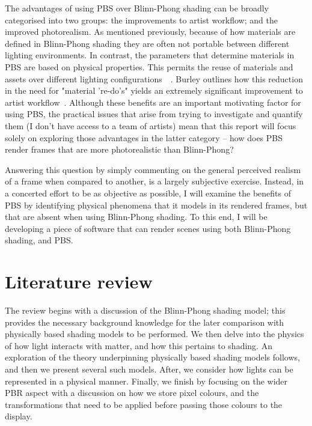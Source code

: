 The advantages of using PBS over Blinn-Phong shading can be broadly categorised into two groups: the improvements to artist workflow; and the improved photorealism. As mentioned previously, because of how materials are defined in Blinn-Phong shading they are often not portable between different lighting environments. In contrast, the parameters that determine materials in PBS are based on physical properties. This permits the reuse of materials and assets over different lighting configurations~\cite{MovingFrostbitetoPBR}~\cite{SIGGRAPH2020Course}. Burley outlines how this reduction in the need for "material 're-do's" yields an extremely significant improvement to artist workflow~\cite{Burley2012Physically}. Although these benefits are an important motivating factor for using PBS, the practical issues that arise from trying to investigate and quantify them (I don’t have access to a team of artists) mean that this report will focus solely on exploring those advantages in the latter category – how does PBS render frames that are more photorealistic than Blinn-Phong?

Answering this question by simply commenting on the general perceived realism of a frame when compared to another, is a largely subjective exercise. Instead, in a concerted effort to be as objective as possible, I will examine the benefits of PBS by identifying physical phenomena that it models in its rendered frames, but that are absent when using Blinn-Phong shading. To this end, I will be developing a piece of software that can render scenes using both Blinn-Phong shading, and PBS.

\section{Literature review}

The review begins with a discussion of the Blinn-Phong shading model; this provides the necessary background knowledge for the later comparison with physically based shading models to be performed. We then delve into the physics of how light interacts with matter, and how this pertains to shading. An exploration of the theory underpinning physically based shading models follows, and then we present several such models. After, we consider how lights can be represented in a physical manner. Finally, we finish by focusing on the wider PBR aspect with a discussion on how we store pixel colours, and the transformations that need to be applied before passing those colours to the display.

